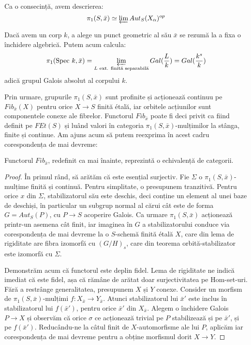 \documentclass[13pt,openany]{book}
\begin{document}
Ca o consecință, avem descrierea:
$$\pi_1(S,\bar{x}) \simeq \varprojlim Aut_S(X_\alpha)^{op}$$

\begin{ex}
Dacă avem un corp $k$, a alege un punct geometric al său $\bar{x}$ se rezumă la a fixa o închidere algebrică. Putem acum calcula:
$$\pi_1(\text{Spec }k,\bar{x})=\varprojlim\limits_{L \text{ ext. finită separabilă}} Gal(\frac{L}{k}) = Gal(\frac{k^s}{k})$$
adică grupul Galois absolut al corpului $k$.
\end{ex}

Prin urmare, grupurile $\pi_1(S,\bar{x})$ sunt profinite și acționează continuu pe $Fib_{\bar{x}}(X)$ pentru orice $X \rightarrow S$ finită étală, iar orbitele acțiunilor sunt componentele conexe ale fibrelor. Functorul $Fib_{\bar{x}}$ poate fi deci privit ca fiind definit pe $FEt(S)$ și luând valori în categoria $\pi_1(S,\bar{x})$-mulțimilor la stânga, finite și continue. Am ajuns acum să putem reexprima în acest cadru corespondența de mai devreme:

\begin{teo}
Functorul $Fib_{\bar{x}}$, redefinit ca mai înainte, reprezintă o echivalență de categorii.
\end{teo}

\begin{proof}
În primul rând, să arătăm că este esențial surjectiv. Fie $\Sigma$ o $\pi_1(S,\bar{x})$-mulțime finită și continuă. Pentru simplitate, o presupunem tranzitivă. Pentru orice $x$ din $\Sigma$, stabilizatorul său este deschis, deci conține un element al unei baze de deschiși, în particular un subgrup normal al cărui cât este de forma $G=Aut_S(P)$, cu $P \rightarrow S$ acoperire Galois. Ca urmare $\pi_1(S,\bar{x})$ acționează printr-un asemena cât finit, iar imaginea în $G$ a stabilizatorului conduce via corespondența de mai devreme la o $S$-schemă finită étală $X$, care din lema de rigiditate are fibra izomorfă cu $(G/H)_s$, care din teorema orbită-stabilizator este izomorfă cu $\Sigma$.

Demonstrăm acum că functorul este deplin fidel. Lema de rigiditate ne indică imediat că este fidel, așa că rămâne de arătat doar surjectivitatea pe Hom-set-uri. Fără a restrânge generalitatea, presupunem $X$ și $Y$ conexe. Consider un morfism de $\pi_1(S,\bar{x})$-mulțimi $f:X_{\bar{x}} \rightarrow Y_{\bar{x}}$. Atunci stabilizatorul lui $\bar{x}'$ este inclus în stabilizatorul lui $f(\bar{x}')$, pentru orice $\bar{x}'$ din $X_{\bar{x}}$. Alegem o închidere Galois $P \rightarrow X$ și observăm că orice $\sigma$ ce acționează trivial pe $P$ stabilizează și pe $\bar{x}'$, și pe $f(\bar{x}')$. Reducându-ne la câtul finit de $X$-automorfisme ale lui $P$, aplicăm iar corespondența de mai devreme pentru a obține morfismul dorit $X \rightarrow Y$.
\end{proof}
\end{document}
